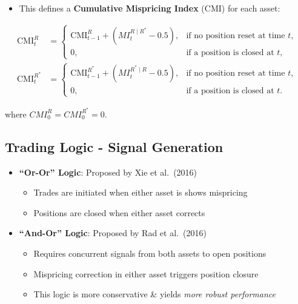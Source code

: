\documentclass[
  letterpaper,
  DIV=11,
  numbers=noendperiod]{scrartcl}
\providecommand{\tightlist}{%
  \setlength{\itemsep}{0pt}\setlength{\parskip}{0pt}}\usepackage{longtable,booktabs,array}
\begin{document}
\begin{itemize}
\tightlist
\item
  This defines a \textbf{Cumulative Mispricing Index} (CMI) for each
  asset:
\end{itemize}

\begin{align}
\mathrm{CMI}^{R}_{t} &=
\begin{cases}
\mathrm{CMI}^{R}_{t-1} + (MI_t^{R\mid R^*} - 0.5), & \text{if no position reset at time } t,\\
0, & \text{if a position is closed at } t,
\end{cases}
\\[1.em]
\mathrm{CMI}^{R^*}_{t} &=
\begin{cases}
\mathrm{CMI}^{R^*}_{t-1} + (MI_t^{R^*\mid R} - 0.5), & \text{if no position reset at time } t,\\
0, & \text{if a position is closed at } t.
\end{cases}
\end{align}

where \(CMI_0^R = CMI_0^{R^*} = 0\).

\subsection{Trading Logic - Signal
Generation}\label{trading-logic---signal-generation}

\begin{itemize}
\tightlist
\item
  \textbf{``Or-Or'' Logic}: Proposed by Xie et al.~(2016)

  \begin{itemize}
  \tightlist
  \item
    Trades are initiated when either asset is shows mispricing
  \item
    Positions are closed when either asset corrects
  \end{itemize}
\end{itemize}

\begin{itemize}
\tightlist
\item
  \textbf{``And-Or'' Logic}: Proposed by Rad et al.~(2016)

  \begin{itemize}
  \tightlist
  \item
    Requires concurrent signals from both assets to open positions
  \item
    Mispricing correction in either asset triggers position closure
  \item
    This logic is more conservative \& yields \emph{more robust
    performance}
  \end{itemize}
\end{itemize}
\end{document}
